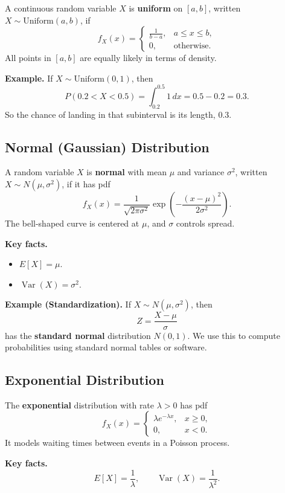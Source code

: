 \documentclass[11pt,a4paper]{article}
\begin{document}
A continuous random variable \(X\) is \textbf{uniform} on \([a,b]\), written \(X \sim \text{Uniform}(a,b)\), if
\[
f_X(x) =
\begin{cases}
\frac{1}{b-a}, & a \le x \le b,\\
0, & \text{otherwise}.
\end{cases}
\]
All points in \([a,b]\) are equally likely in terms of density.

\textbf{Example.}  
If \(X \sim \text{Uniform}(0,1)\), then
\[
P(0.2 < X < 0.5) = \int_{0.2}^{0.5} 1\,dx = 0.5 - 0.2 = 0.3.
\]
So the chance of landing in that subinterval is its length, 0.3.

\subsection{Normal (Gaussian) Distribution}

A random variable \(X\) is \textbf{normal} with mean \(\mu\) and variance \(\sigma^2\), written \(X \sim N(\mu, \sigma^2)\), if it has pdf
\[
f_X(x) = \frac{1}{\sqrt{2\pi\sigma^2}}
\exp\left(-\frac{(x - \mu)^2}{2\sigma^2}\right).
\]
The bell-shaped curve is centered at \(\mu\), and \(\sigma\) controls spread.

\textbf{Key facts.}
\begin{itemize}
    \item \(E[X] = \mu\).
    \item \(\operatorname{Var}(X) = \sigma^2\).
\end{itemize}

\textbf{Example (Standardization).}  
If \(X \sim N(\mu,\sigma^2)\), then
\[
Z = \frac{X - \mu}{\sigma}
\]
has the \textbf{standard normal} distribution \(N(0,1)\).  
We use this to compute probabilities using standard normal tables or software.

\subsection{Exponential Distribution}

The \textbf{exponential} distribution with rate \(\lambda>0\) has pdf
\[
f_X(x) =
\begin{cases}
\lambda e^{-\lambda x}, & x \ge 0,\\
0, & x < 0.
\end{cases}
\]
It models waiting times between events in a Poisson process.

\textbf{Key facts.}
\[
E[X] = \frac{1}{\lambda},\qquad
\operatorname{Var}(X) = \frac{1}{\lambda^2}.
\]
\end{document}
